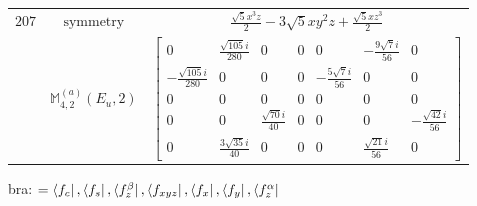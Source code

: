 \documentclass[fleqn,8pt,landscape]{jsarticle}
\begin{document}
\begin{longtable}{ccc}
$ 207 $ & $ \text{symmetry} $ & $ \frac{\sqrt{5} x^{3} z}{2} - 3 \sqrt{5} x y^{2} z + \frac{\sqrt{5} x z^{3}}{2} $ \\
$  $ & $ \mathbb{M}_{4,2}^{(a)}(E_{u},2) $ & $ \begin{bmatrix} 0 & \frac{\sqrt{105} i}{280} & 0 & 0 & 0 & - \frac{9 \sqrt{7} i}{56} & 0 \\ - \frac{\sqrt{105} i}{280} & 0 & 0 & 0 & - \frac{5 \sqrt{7} i}{56} & 0 & 0 \\ 0 & 0 & 0 & 0 & 0 & 0 & 0 \\ 0 & 0 & \frac{\sqrt{70} i}{40} & 0 & 0 & 0 & - \frac{\sqrt{42} i}{56} \\ 0 & \frac{3 \sqrt{35} i}{40} & 0 & 0 & 0 & \frac{\sqrt{21} i}{56} & 0 \end{bmatrix} $ \\ \hline
\end{longtable}
bra: $=\bra{f_{c}}, \bra{f_{s}}, \bra{f_{z}^{\beta}}, \bra{f_{xyz}}, \bra{f_{x}}, \bra{f_{y}}, \bra{f_{z}^{\alpha}}$
\end{document}
